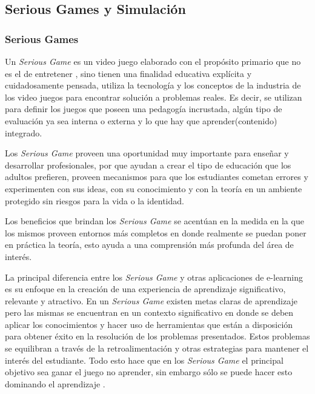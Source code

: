
\subsection{Serious Games y Simulación}

\subsubsection{Serious Games}

Un \emph{Serious Game} es un video juego elaborado con el propósito primario que no es el de entretener \cite{sg:aoverview}, sino tienen una finalidad educativa explícita y cuidadosamente pensada, utiliza la tecnología y los conceptos de la industria de los video juegos para encontrar solución a problemas reales. Es decir, se utilizan para definir los juegos que poseen una pedagogía incrustada, algún tipo de evaluación ya sea interna o externa y lo que hay que aprender(contenido) integrado\cite{damien:sg}.

Los \emph{Serious Game} proveen una oportunidad muy importante para enseñar y desarrollar profesionales, por que ayudan a crear el tipo de educación que los adultos prefieren, proveen mecanismos para que los estudiantes cometan errores y experimenten con sus ideas, con su conocimiento y con la teoría en un ambiente protegido sin riesgos para la vida o la identidad. 

Los beneficios que brindan los \emph{Serious Game} se acentúan en la medida en la que los mismos proveen entornos más completos en donde realmente se puedan poner en práctica la teoría, esto ayuda a una comprensión más profunda del área de interés.

La principal diferencia entre los \emph{Serious Game} y otras aplicaciones de e-learning es su enfoque en la creación de una experiencia de aprendizaje significativo, relevante y atractivo. En un \emph{Serious Game} existen metas claras de aprendizaje pero las mismas se encuentran en un contexto significativo en donde se deben aplicar los conocimientos y hacer uso de herramientas que están a disposición para obtener éxito en la resolución de los problemas presentados. Estos problemas se equilibran a través de la retroalimentación y otras estrategias para mantener el interés del estudiante. Todo esto hace que en los \emph{Serious Game} el principal objetivo sea ganar el juego no aprender, sin embargo sólo se puede hacer esto dominando el aprendizaje \cite{papertian:const}.

